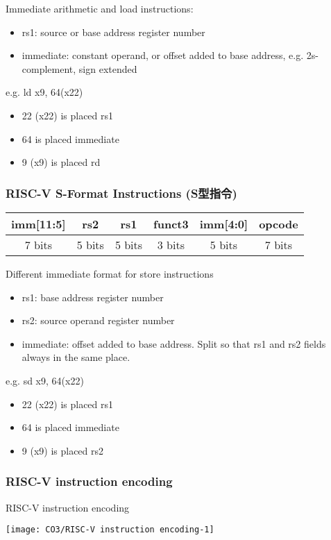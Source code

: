 Immediate arithmetic and load instructions:
\begin{itemize}
    \item rs1: source or base address register number
    \item immediate: constant operand, or offset added to base address, e.g. 2s-complement, sign extended
\end{itemize}

e.g. ld x9, 64(x22)
\begin{itemize}
    \item 22 (x22) is placed rs1
    \item 64 is placed immediate
    \item 9 (x9) is placed rd
\end{itemize}

\subsubsection{RISC-V S-Format Instructions (S型指令)}

\begin{table}[!htb]
    \centering
    \begin{tabular}[c]{|c|c|c|c|c|c|}\hline
        \small imm[11:5] & rs2 & rs1 & funct3 & \small imm[4:0] & opcode \\ \hline
        7 bits & 5 bits & 5 bits & 3 bits & 5 bits &7 bits \\ \hline
    \end{tabular}
\end{table}

Different immediate format for store instructions
\begin{itemize}
    \item rs1: base address register number
    \item rs2: source operand register number
    \item immediate: offset added to base address. Split so that rs1 and rs2 fields always in the same place. 
\end{itemize}

e.g. sd x9, 64(x22)
\begin{itemize}
    \item 22 (x22) is placed rs1
    \item 64 is placed immediate
    \item 9 (x9) is placed rs2
\end{itemize}

\subsubsection{RISC-V instruction encoding}
\begin{table}[!htb]
    \centering
    \caption{RISC-V instruction encoding}
    \texttt{[image: CO3/RISC-V instruction encoding-1]}
\end{table}

